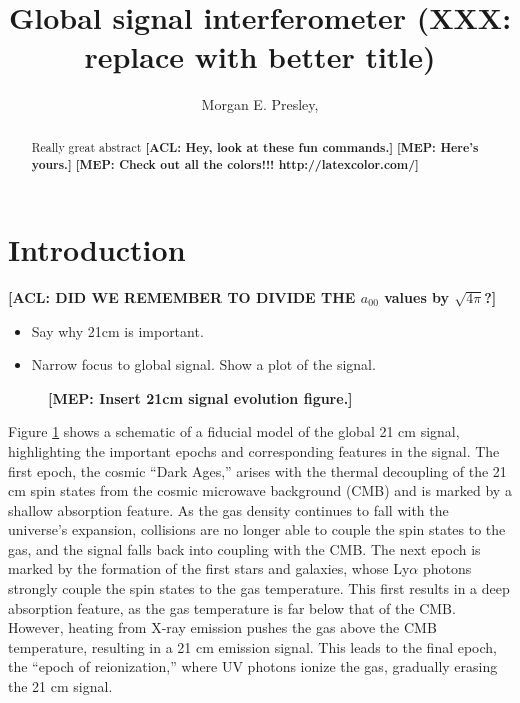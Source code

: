 \documentclass[twolcolumn,apj]{emulateapj}
\newcommand{\acl}[1]{{\color{red} \textbf{[ACL:  #1]}}}
\newcommand{\mep}[1]{{\color{applegreen} \textbf{[MEP:  #1]}}}
\begin{document}
\title{Global signal interferometer (XXX: replace with better title)}

\author{Morgan E. Presley,
}

\begin{abstract}
Really great abstract
\acl{Hey, look at these fun commands.}
\mep{Here's yours.}
\mep {Check out all the colors!!! http://latexcolor.com/}
\end{abstract}



\section{Introduction}
\acl{DID WE REMEMBER TO DIVIDE THE $a_{00}$ values by $\sqrt{4\pi}$?}
\begin{itemize}
\item Say why 21cm is important.
\item Narrow focus to global signal.  Show a plot of the signal.
\end{itemize}

\begin{figure}[h]
	\centering
	\caption{\mep{Insert 21cm signal evolution figure.}}
	\label{fig:21cmSignal}
\end{figure}

Figure \ref{fig:21cmSignal} shows a schematic of a fiducial model of the global 21 cm signal, highlighting the important epochs and corresponding features in the signal. The first epoch, the cosmic ``Dark Ages,'' arises with the thermal decoupling of the 21 cm spin states from the cosmic microwave background (CMB) and is marked by a shallow absorption feature. As the gas density continues to fall with the universe's expansion, collisions are no longer able to couple the spin states to the gas, and the signal falls back into coupling with the CMB. The next epoch is marked by the formation of the first stars and galaxies, whose Ly$\alpha$ photons strongly couple the spin states to the gas temperature. This first results in a deep absorption feature, as the gas temperature is far below that of the CMB. However, heating from X-ray emission pushes the gas above the CMB temperature, resulting in a 21 cm emission signal. This leads to the final epoch, the ``epoch of reionization,'' where UV photons ionize the gas, gradually erasing the 21 cm signal. 
\end{document}
